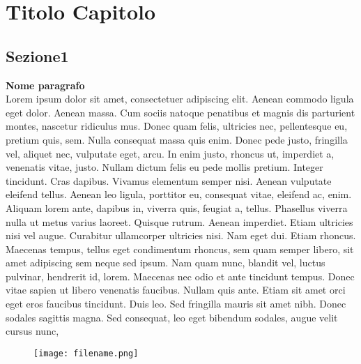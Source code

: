 \chapter{Titolo Capitolo}
\section{Sezione1}
{\bf Nome paragrafo}\\
%
Lorem ipsum dolor sit amet, consectetuer adipiscing elit. Aenean commodo ligula eget dolor.
Aenean massa. Cum sociis natoque penatibus et magnis dis parturient montes, nascetur ridiculus mus.
Donec quam felis, ultricies nec, pellentesque eu, pretium quis, sem. Nulla consequat massa quis enim.
Donec pede justo, fringilla vel, aliquet nec, vulputate eget, arcu. In enim justo, rhoncus ut, imperdiet a, venenatis vitae, justo.
Nullam dictum felis eu pede mollis pretium. Integer tincidunt. Cras dapibus. Vivamus elementum semper nisi.
Aenean vulputate eleifend tellus. Aenean leo ligula, porttitor eu, consequat vitae, eleifend ac, enim.
Aliquam lorem ante, dapibus in, viverra quis, feugiat a, tellus. Phasellus viverra nulla ut metus varius laoreet.
Quisque rutrum. Aenean imperdiet. Etiam ultricies nisi vel augue. Curabitur ullamcorper ultricies nisi.
Nam eget dui. Etiam rhoncus. Maecenas tempus, tellus eget condimentum rhoncus, sem quam semper libero,
sit amet adipiscing sem neque sed ipsum. Nam quam nunc, blandit vel, luctus pulvinar, hendrerit id, lorem.
Maecenas nec odio et ante tincidunt tempus. Donec vitae sapien ut libero venenatis faucibus.
Nullam quis ante. Etiam sit amet orci eget eros faucibus tincidunt. Duis leo.
Sed fringilla mauris sit amet nibh. Donec sodales sagittis magna.
Sed consequat, leo eget bibendum sodales, augue velit cursus nunc,


\newline

\begin{figure}[h]
\centering
\texttt{[image: filename.png]}\\
\end{figure}
